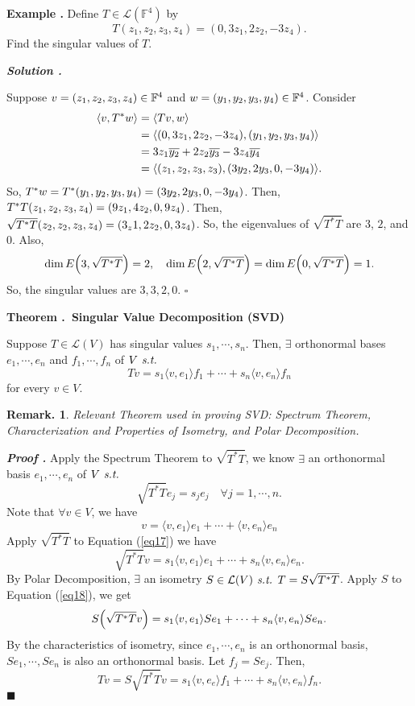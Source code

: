 \documentclass[11pt, letterpaper]{article}
\newcounter{index}[subsection]
\newenvironment*{eg}{\begin{framed}\par\noindent\textbf{Example \thesubsection.\stepcounter{index}\theindex}}{\par\end{framed}}
\newenvironment*{thm}[1]{\begin{tcolorbox}\par\noindent\textbf{Theorem \thesubsection.\stepcounter{index}\theindex\ #1} \par}{\par\end{tcolorbox}}
\newcounter{nprf}[subsection]
\newenvironment*{prf}{\par\indent\textbf{\textit{Proof \stepcounter{nprf}\thenprf.}}}{\hfill$\blacksquare$\par}
\newenvironment*{sol}{\par\indent\textbf{\textit{Solution \stepcounter{nprf}\thenprf.}}\par}{\hfill{$\square$}\par}
\newtheorem*{rmk}{Remark.}
\def\F{\mathbb{F}}
\def\L{\mathcal{L}}
\def\st{\emph{ s.t. }}
\begin{document}
\begin{eg}
	Define $T\in\L(\F^4)$ by \[T(z_1,z_2,z_3,z_4)=(0,3z_1,2z_2,-3z_4).\] Find the singular values of $T$. 
	\begin{sol}
		Suppose $v=\qty(z_1,z_2,z_3,z_4)\in\F^4$ and $w=\qty(y_1,y_2,y_3,y_4)\in\F^4$. Consider \[\begin{aligned}\langle v,T^*w\rangle&=\langle Tv,w\rangle\\&=\langle\qty(0,3z_1,2z_2,-3z_4),\qty(y_1,y_2,y_3,y_4)\rangle\\&=3z_1\overline{y_2}+2z_2\overline{y_3}-3z_4\overline{y_4}\\&=\langle\qty(z_1,z_2,z_3,z_3),\qty(3y_2,2y_3,0,-3y_4)\rangle.\end{aligned}\] So, $T^*w=T^*\qty(y_1,y_2,y_3,y_4)=\qty(3y_2,2y_3,0,-3y_4)$. Then, $T^*T\qty(z_1,z_2,z_3,z_4)=\qty(9z_1,4z_2,0,9z_4)$. Then, $\sqrt{T^*T}\qty(z_2,z_2,z_3,z_4)=\qty(3_z1,2z_2,0,3z_4)$. So, the eigenvalues of $\sqrt{T^*T}$ are $3$, $2$, and $0$. Also, \[\dim E\qty(3,\sqrt{T^*T})=2,\quad\dim E\qty(2,\sqrt{T^*T})=\dim E\qty(0,\sqrt{T^*T})=1.\] So, the singular values are $3,3,2,0$.
	\end{sol}
\end{eg}
\begin{thm}{Singular Value Decomposition (SVD)}
	Suppose $T\in\L(V)$ has singular values $s_1,\cdots,s_n$. Then, $\exists$ orthonormal bases $e_1,\cdots,e_n$ and $f_1,\cdots,f_n$ of $V\st$ \[Tv=s_1\langle v,e_1\rangle f_1+\cdots+s_n\langle v,e_n\rangle f_n\] for every $v\in V$.
\end{thm}
\begin{rmk}Relevant Theorem used in proving SVD: Spectrum Theorem, Characterization and Properties of Isometry, and Polar Decomposition. \end{rmk}
\begin{prf}
	Apply the Spectrum Theorem to $\sqrt{T^*T}$, we know $\exists$ an orthonormal basis $e_1,\cdots,e_n$ of $V\st$\[\sqrt{T^*T}e_j=s_je_j\quad\forall j=1,\cdots,n.\] Note that $\forall v\in V$, we have \begin{equation}\label{eq17} v=\langle v,e_1\rangle e_1+\cdots+\langle v,e_n\rangle e_n\end{equation} Apply $\sqrt{T^*T}$ to Equation (\ref{eq17}) we have \begin{equation}\label{eq18} \sqrt{T^*T}v=s_1\langle v,e_1\rangle e_1+\cdots+s_n\langle v,e_n\rangle e_n.\end{equation} By Polar Decomposition, $\exists$ an isometry $S\in\L(V)\st T=S\sqrt{T^*T}$. Apply $S$ to Equation (\ref{eq18}), we get \[S\qty(\sqrt{T^*T}v)=s_1\langle v,e_1\rangle Se_1+\cdots+s_n\langle v,e_n\rangle Se_n.\] By the characteristics of isometry, since $e_1,\cdots,e_n$ is an orthonormal basis, $Se_1,\cdots,Se_n$ is also an orthonormal basis. Let $f_j=Se_j$. Then, \[Tv=S\sqrt{T^*T}v=s_1\langle v,e_e\rangle f_1+\cdots+s_n\langle v,e_n\rangle f_n.\]
\end{prf}
\end{document}
